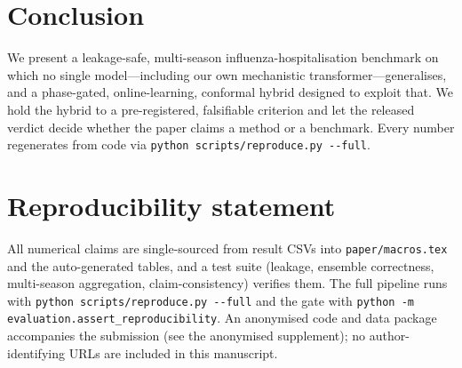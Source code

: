 \documentclass{article}
\begin{document}
\section{Conclusion}
We present a leakage-safe, multi-season influenza-hospitalisation benchmark on which no single
model---including our own mechanistic transformer---generalises, and a phase-gated, online-learning,
conformal hybrid designed to exploit that. We hold the hybrid to a pre-registered, falsifiable
criterion and let the released verdict decide whether the paper claims a method or a benchmark.
Every number regenerates from code via \texttt{python scripts/reproduce.py -{}-full}.

\section*{Reproducibility statement}
All numerical claims are single-sourced from result CSVs into \texttt{paper/macros.tex} and the
auto-generated tables, and a test suite (leakage, ensemble correctness, multi-season aggregation,
claim-consistency) verifies them. The full pipeline runs with
\texttt{python scripts/reproduce.py -{}-full} and the gate with
\texttt{python -m evaluation.assert\_reproducibility}. An anonymised code and data package
accompanies the submission (see the anonymised supplement); no author-identifying URLs are included
in this manuscript.
\end{document}
